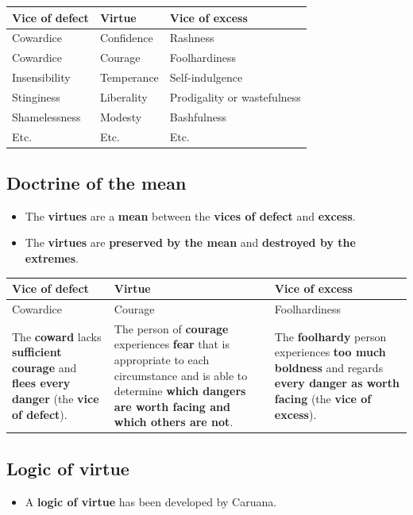 \documentclass[11pt]{article}
\begin{document}
\begin{center}
\begin{tabularx}{\textwidth}{X|X|X}
Vice of defect & Virtue & Vice of excess\\
\hline
Cowardice & Confidence & Rashness\\
Cowardice & Courage & Foolhardiness\\
Insensibility & Temperance & Self-indulgence\\
Stinginess & Liberality & Prodigality or wastefulness\\
Shamelessness & Modesty & Bashfulness\\
Etc. & Etc. & Etc.\\
\end{tabularx}
\end{center}
\subsection{Doctrine of the mean}
\label{sec:org1c300ee}
\begin{itemize}
\item The \textbf{virtues} are a \textbf{mean} between the \textbf{vices of defect} and \textbf{excess}.
\item The \textbf{virtues} are \textbf{preserved by the mean} and \textbf{destroyed by the extremes}.
\end{itemize}

\begin{center}
\begin{tabularx}{\textwidth}{|X|X|X|}
\hline
Vice of defect & Virtue & Vice of excess\\
\hline
Cowardice & Courage & Foolhardiness\\
\hline
The \textbf{coward} lacks \textbf{sufficient courage} and \textbf{flees every danger} (the \textbf{vice of defect}). & The person of \textbf{courage} experiences \textbf{fear} that is appropriate to each circumstance and is able to determine \textbf{which dangers are worth facing and which others are not}. & The \textbf{foolhardy} person experiences \textbf{too much boldness} and regards \textbf{every danger as worth facing} (the \textbf{vice of excess}).\\
\hline
\end{tabularx}
\end{center}

 \newpage
\subsection{Logic of virtue}
\label{sec:org1fdc6ae}
\begin{itemize}
\item A \textbf{logic of virtue} has been developed by Caruana.
\end{itemize}
\end{document}
